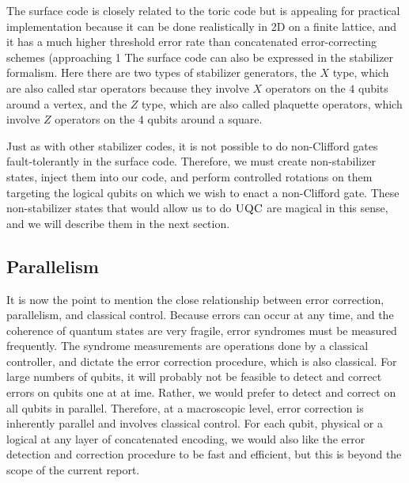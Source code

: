
The surface code is closely related to the toric code but is appealing for
practical implementation because it can be done realistically
in 2D on a finite lattice, and it has a much higher threshold error rate
than concatenated error-correcting schemes (approaching 1%
The surface code can also be expressed in the stabilizer formalism. Here there
are two types of stabilizer generators, the $X$ type, which are also called
star operators because they involve $X$ operators on the $4$ qubits around a 
vertex, and the $Z$ type, which are also called plaquette operators, which
involve $Z$ operators on the $4$ qubits around a square.

Just as with other stabilizer codes, it is not possible to do non-Clifford
gates fault-tolerantly in the surface code. Therefore, we must create
non-stabilizer states, inject them into our code, and perform controlled
rotations on them targeting the logical qubits on which we wish to enact
a non-Clifford gate. These non-stabilizer states that would allow us to
do $\textsc{UQC}$ are magical in this sense, and we will describe them in the next
section.


\subsection{Parallelism}

It is now the point to mention the close relationship between error correction,
parallelism, and classical control. Because errors can occur at any time,
and the coherence of quantum states are very fragile, error syndromes must be
measured frequently. The syndrome measurements are operations done by a
classical controller, and dictate the error correction procedure, which is
also classical. For large numbers of qubits, it will probably not be
feasible to detect and correct errors on qubits one at at ime. Rather, we would
prefer to detect and correct on all qubits in parallel. Therefore, at a
macroscopic level, error correction is inherently parallel and involves
classical control. For each qubit, physical or a logical at any
layer of concatenated encoding, we would also like the error detection
and correction procedure to be fast and efficient, but this is beyond the
scope of the current report.